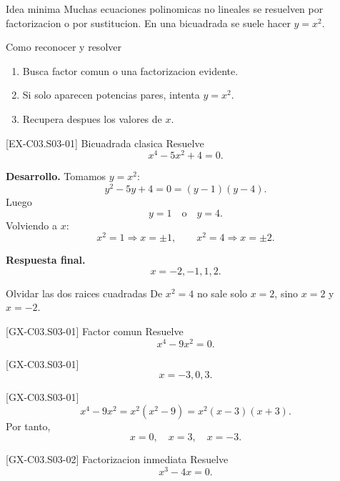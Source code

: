 \begin{theorybox}{Idea minima}
Muchas ecuaciones polinomicas no lineales se resuelven por factorizacion o por sustitucion. En
una bicuadrada se suele hacer \(y=x^2\).
\end{theorybox}

\begin{methodbox}{Como reconocer y resolver}
\begin{enumerate}
  \item Busca factor comun o una factorizacion evidente.
  \item Si solo aparecen potencias pares, intenta \(y=x^2\).
  \item Recupera despues los valores de \(x\).
\end{enumerate}
\end{methodbox}

\begin{solvedexample}{[EX-C03.S03-01] Bicuadrada clasica}
Resuelve
\[
x^4-5x^2+4=0.
\]

\textbf{Desarrollo.} Tomamos \(y=x^2\):
\[
y^2-5y+4=0=(y-1)(y-4).
\]
Luego
\[
y=1 \quad \text{o} \quad y=4.
\]
Volviendo a \(x\):
\[
x^2=1 \Longrightarrow x=\pm 1,
\qquad
x^2=4 \Longrightarrow x=\pm 2.
\]

\textbf{Respuesta final.}
\[
x=-2,-1,1,2.
\]
\end{solvedexample}

\begin{commonerror}{Olvidar las dos raices cuadradas}
De \(x^2=4\) no sale solo \(x=2\), sino \(x=2\) y \(x=-2\).
\end{commonerror}

\begin{guidedexercise}{[GX-C03.S03-01] Factor comun}
Resuelve
\[
x^4-9x^2=0.
\]
\end{guidedexercise}

\begin{shortanswer}{[GX-C03.S03-01]}
\[
x=-3,0,3.
\]
\end{shortanswer}

\begin{fullsolution}{[GX-C03.S03-01]}
\[
x^4-9x^2=x^2(x^2-9)=x^2(x-3)(x+3).
\]
Por tanto,
\[
x=0,\quad x=3,\quad x=-3.
\]
\end{fullsolution}

\begin{guidedexercise}{[GX-C03.S03-02] Factorizacion inmediata}
Resuelve
\[
x^3-4x=0.
\]
\end{guidedexercise}


